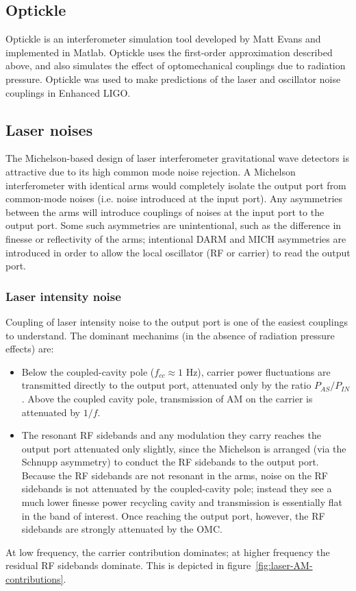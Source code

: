 \subsection*{Optickle}
Optickle\cite{Evans2007Optickle} is an interferometer simulation tool
developed by Matt Evans and implemented in Matlab.  Optickle uses the
first-order approximation described above, and also simulates the
effect of optomechanical couplings due to radiation pressure.
Optickle was used to make predictions of the laser and oscillator
noise couplings in Enhanced LIGO.

\subsection{Laser noises}

The Michelson-based design of laser interferometer gravitational wave detectors
is attractive due to its high common mode noise rejection.  A Michelson
interferometer with identical arms would completely isolate the output port from
common-mode noises (i.e. noise introduced at the input port).  Any asymmetries
between the arms will introduce couplings of noises at the input port to the
output port.  Some such asymmetries are unintentional, such as the difference in
finesse or reflectivity of the arms; intentional DARM and MICH asymmetries are
introduced in order to allow the local oscillator (RF or carrier) to read the
output port.

\subsubsection{Laser intensity noise}

Coupling of laser intensity noise to the output port is one of the easiest
couplings to understand.  The dominant mechanims (in the absence of radiation
pressure effects) are:
%
\begin{itemize}
\item Below the coupled-cavity pole ($f_{cc}\approx 1$ Hz), carrier power
  fluctuations are transmitted directly to the output port, attenuated only by
  the ratio $P_{AS}/P_{IN}$.  Above the coupled cavity pole, transmission of AM
  on the carrier is attenuated by $1/f$.
\item The resonant RF sidebands and any modulation they carry reaches the output
  port attenuated only slightly, since the Michelson is arranged (via the
  Schnupp asymmetry) to conduct the RF sidebands to the output port.  Because
  the RF sidebands are not resonant in the arms, noise on the RF sidebands is
  not attenuated by the coupled-cavity pole; instead they see a much lower
  finesse power recycling cavity and transmission is essentially flat in the
  band of interest.  Once reaching the output port, however, the RF sidebands
  are strongly attenuated by the OMC.
\end{itemize}
At low frequency, the carrier contribution dominates; at higher
frequency the residual RF sidebands dominate.  This is depicted in
figure~\ref{fig:laser-AM-contributions}.

